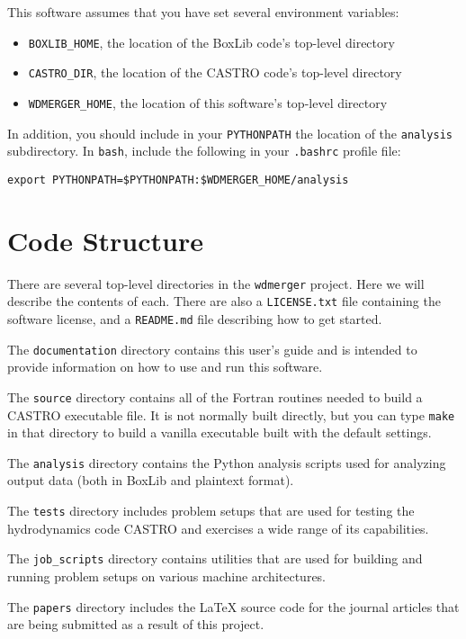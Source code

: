 \documentclass[12pt]{book}
\begin{document}
This software assumes that you have set several environment variables:
\begin{itemize}
  \item \texttt{BOXLIB\_HOME}, the location of the BoxLib code's top-level directory
  \item \texttt{CASTRO\_DIR}, the location of the CASTRO code's top-level directory
  \item \texttt{WDMERGER\_HOME}, the location of this software's top-level directory
\end{itemize}

In addition, you should include in your \texttt{PYTHONPATH} the location of the 
\texttt{analysis} subdirectory. In \texttt{bash}, include the following in your 
\texttt{.bashrc} profile file:

\texttt{export PYTHONPATH=\$PYTHONPATH:\$WDMERGER\_HOME/analysis}

\chapter{Code Structure}

There are several top-level directories in the \texttt{wdmerger} project. Here we will describe
the contents of each. There are also a \texttt{LICENSE.txt} file containing the software license,
and a \texttt{README.md} file describing how to get started.

The \texttt{documentation} directory contains this user's guide and is intended to provide information
on how to use and run this software.

The \texttt{source} directory contains all of the Fortran routines needed to build a CASTRO 
executable file. It is not normally built directly, but you can type \texttt{make} in that directory
to build a vanilla executable built with the default settings.

The \texttt{analysis} directory contains the Python analysis scripts used for analyzing output
data (both in BoxLib and plaintext format). 

The \texttt{tests} directory includes problem setups that are used for testing 
the hydrodynamics code CASTRO and exercises a wide range of its capabilities.

The \texttt{job\_scripts} directory contains utilities that are used for building and running
problem setups on various machine architectures.

The \texttt{papers} directory includes the LaTeX source code for the journal articles
that are being submitted as a result of this project.
\end{document}
